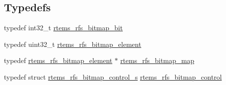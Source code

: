 \subsection*{Typedefs}
\begin{DoxyCompactItemize}
\item 
typedef int32\+\_\+t \mbox{\hyperlink{rtems-rfs-bitmaps_8h_acc1b0aefe1b090890ccbc1b05279a78e}{rtems\+\_\+rfs\+\_\+bitmap\+\_\+bit}}
\item 
typedef uint32\+\_\+t \mbox{\hyperlink{rtems-rfs-bitmaps_8h_a2e909e0a0c9759ac71ca69851253b905}{rtems\+\_\+rfs\+\_\+bitmap\+\_\+element}}
\item 
typedef \mbox{\hyperlink{rtems-rfs-bitmaps_8h_a2e909e0a0c9759ac71ca69851253b905}{rtems\+\_\+rfs\+\_\+bitmap\+\_\+element}} $\ast$ \mbox{\hyperlink{rtems-rfs-bitmaps_8h_ad7417fa816b1cfccbc03fc564a5b341b}{rtems\+\_\+rfs\+\_\+bitmap\+\_\+map}}
\item 
typedef struct \mbox{\hyperlink{structrtems__rfs__bitmap__control__s}{rtems\+\_\+rfs\+\_\+bitmap\+\_\+control\+\_\+s}} \mbox{\hyperlink{rtems-rfs-bitmaps_8h_aa1b1de5abc294444428eb1038d7f898b}{rtems\+\_\+rfs\+\_\+bitmap\+\_\+control}}
\end{DoxyCompactItemize}
